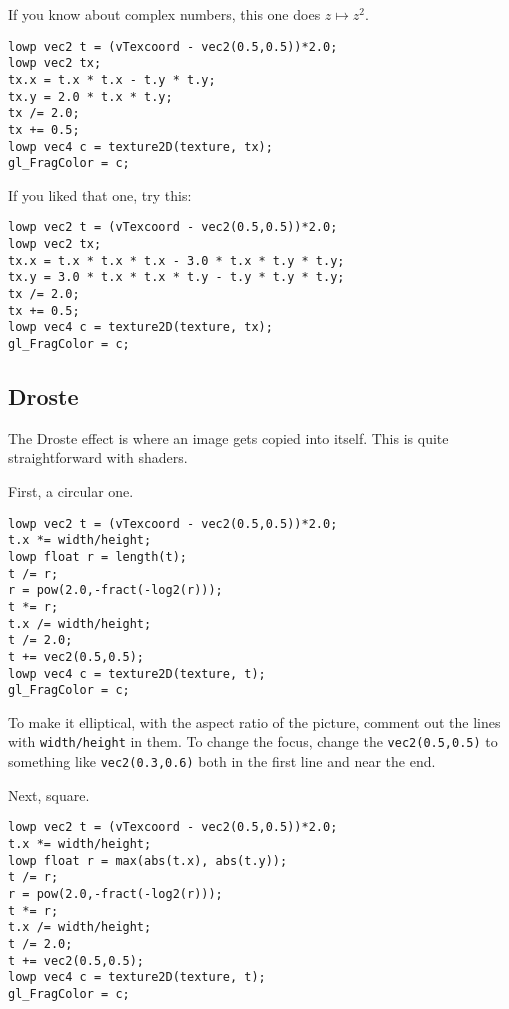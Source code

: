 \documentclass[
  html5,%
  mathml,%
  use filename%
]{internet}
\begin{document}
If you know about complex numbers, this one does \(z \mapsto z^2\).

\begin{tcolorbox}
\begin{verbatim}
lowp vec2 t = (vTexcoord - vec2(0.5,0.5))*2.0;
lowp vec2 tx;
tx.x = t.x * t.x - t.y * t.y;
tx.y = 2.0 * t.x * t.y;
tx /= 2.0;
tx += 0.5;
lowp vec4 c = texture2D(texture, tx);
gl_FragColor = c;
\end{verbatim}
\end{tcolorbox}

If you liked that one, try this:

\begin{tcolorbox}
\begin{verbatim}
lowp vec2 t = (vTexcoord - vec2(0.5,0.5))*2.0;
lowp vec2 tx;
tx.x = t.x * t.x * t.x - 3.0 * t.x * t.y * t.y;
tx.y = 3.0 * t.x * t.x * t.y - t.y * t.y * t.y;
tx /= 2.0;
tx += 0.5;
lowp vec4 c = texture2D(texture, tx);
gl_FragColor = c;
\end{verbatim}
\end{tcolorbox}

\subsection{Droste}

The Droste effect is where an image gets copied into itself.
This is quite straightforward with shaders.

First, a circular one.

\begin{tcolorbox}
\begin{verbatim}
lowp vec2 t = (vTexcoord - vec2(0.5,0.5))*2.0;
t.x *= width/height;
lowp float r = length(t);
t /= r;
r = pow(2.0,-fract(-log2(r)));
t *= r;
t.x /= width/height;
t /= 2.0;
t += vec2(0.5,0.5);
lowp vec4 c = texture2D(texture, t);
gl_FragColor = c;
\end{verbatim}
\end{tcolorbox}

To make it elliptical, with the aspect ratio of the picture, comment out the lines with \verb+width/height+ in them.
To change the focus, change the \verb+vec2(0.5,0.5)+ to something like \verb+vec2(0.3,0.6)+ both in the first line and near the end.

Next, square.

\begin{tcolorbox}
\begin{verbatim}
lowp vec2 t = (vTexcoord - vec2(0.5,0.5))*2.0;
t.x *= width/height;
lowp float r = max(abs(t.x), abs(t.y));
t /= r;
r = pow(2.0,-fract(-log2(r)));
t *= r;
t.x /= width/height;
t /= 2.0;
t += vec2(0.5,0.5);
lowp vec4 c = texture2D(texture, t);
gl_FragColor = c;
\end{verbatim}
\end{tcolorbox}
\end{document}
